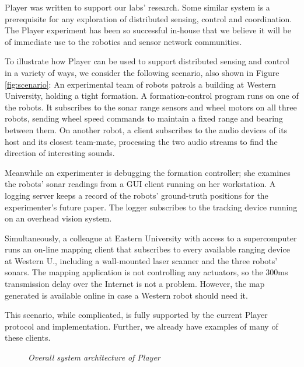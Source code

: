 Player was written to support our labs' research. Some similar system
is a prerequisite for any exploration of distributed sensing, control
and coordination. The Player experiment has been so successful
in-house that we believe it will be of immediate use to the robotics
and sensor network communities.


\label{scenario}
To illustrate how Player can be used to support distributed sensing
and control in a variety of ways, we consider the following scenario,
also shown in Figure \ref{fig:scenario}: An experimental team of
robots patrols a building at Western University, holding a tight
formation. A formation-control program runs on one of the robots. It
subscribes to the sonar range sensors and wheel motors on all three
robots, sending wheel speed commands to maintain a fixed range and
bearing between them. On another robot, a client subscribes to the
audio devices of its host and its closest team-mate, processing the
two audio streams to find the direction of interesting sounds.

Meanwhile an experimenter is debugging the formation controller; she
examines the robots' sonar readings from a GUI client running on her
workstation. A logging server keeps a record of the robots'
ground-truth positions for the experimenter's future paper. The logger
subscribes to the tracking device running on an overhead vision
system.

Simultaneously, a colleague at Eastern University with access to a
supercomputer runs an on-line mapping client that subscribes to every
available ranging device at Western U., including a wall-mounted laser
scanner and the three robots' sonars. The mapping application is not
controlling any actuators, so the 300ms transmission delay over the
Internet is not a problem. However, the map generated is available
online in case a Western robot should need it.

This scenario, while complicated, is fully supported by the current
Player protocol and implementation. Further, we already have examples of
many of these clients.
\begin{figure*}
 \centering
  \caption{{\sl Overall system architecture of Player}}
  \label{figure:buffers}
\end{figure*} 

